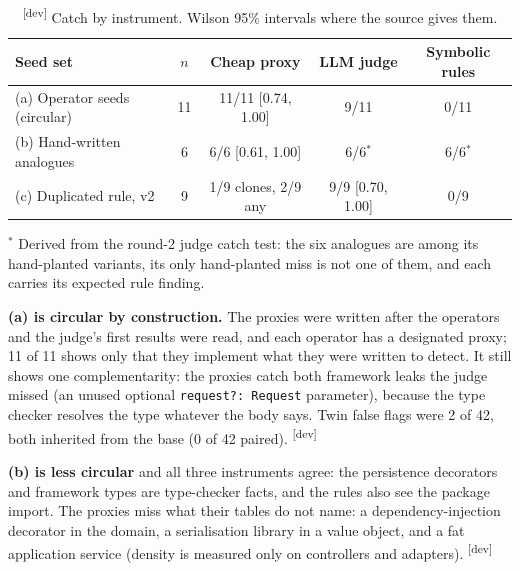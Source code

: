 \documentclass[10pt,a4paper]{article}
\newcommand{\devset}{\textsuperscript{\textsf{\tiny[dev]}}}
\begin{document}
\begin{table}[h]
\centering\small
\caption{\devset{} Catch by instrument. Wilson 95\% intervals where the source gives them.}
\label{tab:results}
\begin{tabular}{lcccc}
\toprule
Seed set & $n$ & Cheap proxy & LLM judge & Symbolic rules \\
\midrule
(a) Operator seeds (circular) & 11 & 11/11 [0.74, 1.00] & 9/11 & 0/11 \\
(b) Hand-written analogues & 6 & 6/6 [0.61, 1.00] & 6/6$^{*}$ & 6/6$^{*}$ \\
(c) Duplicated rule, v2 & 9 & 1/9 clones, 2/9 any & 9/9 [0.70, 1.00] & 0/9 \\
\bottomrule
\end{tabular}

\smallskip\footnotesize $^{*}$ Derived from the round-2 judge catch test: the six analogues are among its
hand-planted variants, its only hand-planted miss is not one of them, and each carries its expected rule finding.
\end{table}

\textbf{(a) is circular by construction.} The proxies were written after the operators and the judge's first results
were read, and each operator has a designated proxy; 11 of 11 shows only that they implement what they were written to
detect. It still shows one complementarity: the proxies catch both framework leaks the judge missed (an unused
optional \texttt{request?: Request} parameter), because the type checker resolves the type whatever the body says.
Twin false flags were 2 of 42, both inherited from the base (0 of 42 paired). \devset{}

\textbf{(b) is less circular} and all three instruments agree: the persistence decorators and framework types are
type-checker facts, and the rules also see the package import. The proxies miss what their tables do not name: a
dependency-injection decorator in the domain, a serialisation library in a value object, and a fat application
service (density is measured only on controllers and adapters). \devset{}
\end{document}
